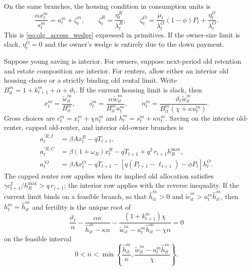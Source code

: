 On the same branches, the housing condition in consumption units is
\begin{equation}
 \frac{\alpha x_t^m}{s_t^m}
 =u_t^m+\zeta_t^m,\qquad
 \zeta_t^R=\frac{\eta_t^R}{\lambda_t^R},\qquad
 \zeta_t^O=
 \frac{\mu_t}{\lambda_t^O}(1-\phi)P_t
 +\frac{\eta_t^O}{\lambda_t^O}.
 \label{eq:olg_app_housing_kkt}
\end{equation}
This is \eqref{eq:olg_access_wedge} expressed in primitives.  If the owner-size
limit is slack, $\eta_t^O=0$ and the owner's wedge is entirely due to the down
payment.

\begin{proposition}
\label{prop:olg_app_conditional_policies}
Suppose young saving is interior.  For owners, suppose next-period old
retention and estate composition are interior.  For renters, allow either an
interior old housing choice or a strictly binding old rental limit.  Write
$B_{it}^m=1+k_{t+1}^m+\alpha+\vartheta_t$.  If the current housing limit is
slack, then
\begin{equation}
 x_t^m=\frac{\widetilde w_{it}^m}{B_{it}^m},\qquad
 s_t^m=\frac{\alpha\widetilde w_{it}^m}{B_{it}^m u_t^m},\qquad
 n_t^m=\frac{\vartheta_t\widetilde w_{it}^m}
 {B_{it}^m(\chi+\kappa u_t^m)}.
 \label{eq:olg_unconstrained_policies}
\end{equation}
Gross choices are $c_t^m=x_t^m+\chi n_t^m$ and
$h_t^m=s_t^m+\kappa n_t^m$.  Saving on the interior old-renter, capped
old-renter, and interior old-owner branches is
\begin{align}
 a_t^{\prime R,I}&=\beta A x_t^R-qT_{t+1},
 \label{eq:olg_app_renter_saving}\\
 a_t^{\prime R,C}&=\beta(1+\omega_B)x_t^R-qT_{t+1}
 +q^2\,r_{t+1}h_R^{\max},
 \label{eq:olg_app_renter_capped_saving}\\
 a_t^{\prime O}&=\beta A x_t^O-qT_{t+1}
 -[q(P_{t+1}-\ell_{t+1})-\phi P_t]h_t^O.
 \label{eq:olg_app_owner_saving}
\end{align}
The capped renter row applies when its implied old allocation satisfies
$\gamma c_{t+1}^2/h_R^{\max}>q\,r_{t+1}$; the interior row applies with the
reverse inequality.  If the current limit binds on a feasible branch, so that
$\widehat h_{it}^m>0$ and
$\widetilde w_{it}^m>u_t^m\widehat h_{it}^m$, then
$h_t^m=\widehat h_{it}^m$ and fertility is the unique root of
\begin{equation}
 \frac{\vartheta_t}{n}
 -\frac{\alpha\kappa}{\widehat h_{it}^m-\kappa n}
 -\frac{(1+k_{t+1}^m)\chi}
 {\widetilde w_{it}^m-u_t^m\widehat h_{it}^m-\chi n}=0
 \label{eq:olg_binding_fertility}
\end{equation}
on the feasible interval
\begin{equation}
 0<n<\min\left\{
 \frac{\widehat h_{it}^m}{\kappa},
 \frac{\widetilde w_{it}^m-u_t^m\widehat h_{it}^m}{\chi}
 \right\}.
 \label{eq:olg_app_binding_domain}
\end{equation}
\end{proposition}

